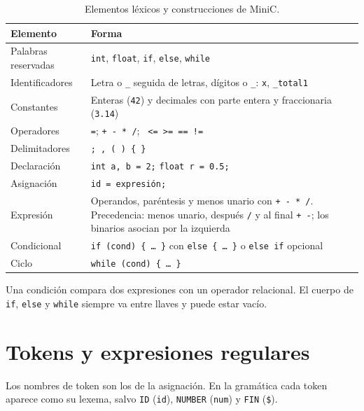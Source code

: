 \documentclass[12pt]{article}
\newcommand{\cmd}[1]{\texttt{\small #1}}
\begin{document}
\renewcommand{\arraystretch}{1.2}
\begin{table}[!htbp]
\centering\small
\begin{tabularx}{\textwidth}{@{}>{\raggedright\arraybackslash}p{3.6cm}X@{}}
\toprule
\textbf{Elemento} & \textbf{Forma} \\
\midrule
Palabras reservadas & \cmd{int}, \cmd{float}, \cmd{if}, \cmd{else}, \cmd{while} \\
Identificadores & Letra o \cmd{\_} seguida de letras, dígitos o \cmd{\_}: \cmd{x}, \cmd{\_total1} \\
Constantes & Enteras (\cmd{42}) y decimales con parte entera y fraccionaria (\cmd{3.14}) \\
Operadores & \cmd{=}; \cmd{+ - * /}; \cmd{< > <= >= == !=} \\
Delimitadores & \cmd{; , ( ) \{ \}} \\
\midrule
Declaración & \cmd{int a, b = 2;} \quad \cmd{float r = 0.5;} \\
Asignación & \cmd{id = expresión;} \\
Expresión & Operandos, paréntesis y menos unario con \cmd{+ - * /}. Precedencia: menos unario,
después \cmd{* /} y al final \cmd{+ -}; los binarios asocian por la izquierda \\
Condicional & \cmd{if (cond) \{ \dots\ \}} con \cmd{else \{ \dots\ \}} o \cmd{else if} opcional \\
Ciclo & \cmd{while (cond) \{ \dots\ \}} \\
\bottomrule
\end{tabularx}
\caption{Elementos léxicos y construcciones de MiniC.}
\label{tab:lenguaje}
\end{table}

Una condición compara dos expresiones con un operador relacional. El cuerpo de \cmd{if},
\cmd{else} y \cmd{while} siempre va entre llaves y puede estar vacío.

\section{Tokens y expresiones regulares}
\label{sec:tokens}

Los nombres de token son los de la asignación. En la gramática cada token aparece como su
lexema, salvo \cmd{ID} (\cmd{id}), \cmd{NUMBER} (\cmd{num}) y \cmd{FIN} (\cmd{\$}).
\end{document}
